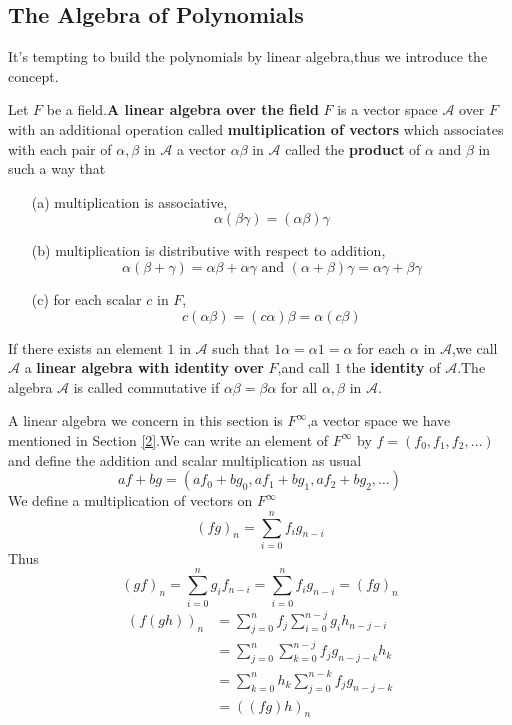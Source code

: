 \documentclass{article}
\begin{document}
\subsection{The Algebra of Polynomials}
\noindent It's tempting to build the polynomials by linear algebra,thus we introduce the concept.
\begin{dde}
	Let $F$ be a field.\textbf{A linear algebra over the field} $F$ is a vector space $\mathcal{A}$ over $F$ with an additional operation called \textbf{multiplication of vectors} which associates with each pair of $\alpha,\beta$ in $\mathcal{A}$ a vector $\alpha\beta$ in $\mathcal{A}$ called the \textbf{product} of $\alpha$ and $\beta$ in such a way that
	\begin{enumerate}
		\item [(a)]multiplication is associative,
		\[\alpha(\beta\gamma)=(\alpha\beta)\gamma\]
		\item [(b)]multiplication is distributive with respect to addition,
		\[\alpha(\beta+\gamma)=\alpha\beta+\alpha\gamma\text{ and }(\alpha+\beta)\gamma=\alpha\gamma+\beta\gamma\]
		\item [(c)]for each scalar $c$ in $F$,
		\[c(\alpha\beta)=(c\alpha)\beta=\alpha(c\beta)\]
	\end{enumerate} 
	If there exists an element $1$ in $\mathcal{A}$ such that $1\alpha=\alpha1=\alpha$ for each $\alpha$ in $\mathcal{A}$,we call $\mathcal{A}$ a \textbf{linear algebra with identity over} $F$,and call $1$ the \textbf{identity} of $\mathcal{A}$.The algebra $\mathcal{A}$ is called commutative if $\alpha\beta=\beta\alpha$ for all $\alpha,\beta$ in $\mathcal{A}$. 
\end{dde}
A linear algebra we concern in this section is $F^\infty$,a vector space we have mentioned in Section \ref{2}.We can write an element of $F^\infty$ by $f=(f_0,f_1,f_2,\dots)$ and define the addition and scalar multiplication as usual
\[af+bg=(af_0+bg_0,af_1+bg_1,af_2+bg_2,\dots)\]
We define a multiplication of vectors on $F^\infty$
\[(fg)_n=\sum\limits_{i=0}^nf_{i}g_{n-i}\]
Thus
\[(gf)_n=\sum\limits_{i=0}^ng_{i}f_{n-i}=\sum\limits_{i=0}^nf_{i}g_{n-i}=(fg)_n\]
\begin{align*}
	(f(gh))_n&=\sum\limits_{j=0}^nf_j\sum\limits_{i=0}^{n-j}g_ih_{n-j-i}\\
	&=\sum\limits_{j=0}^n\sum\limits_{k=0}^{n-j}f_jg_{n-j-k}h_k\\
	&=\sum\limits_{k=0}^nh_k\sum\limits_{j=0}^{n-k}f_jg_{n-j-k}\\
	&=((fg)h)_n
\end{align*}
\end{document}
